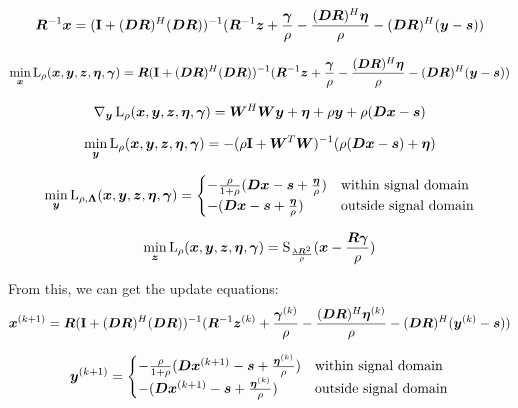 \documentclass{article}
\begin{document}
\begin{equation}
\bm{R}^{-1}\bm{x} = ({\bf I} + (\bm{D}\bm{R})^H(\bm{D}\bm{R}))^{-1}(\bm{R}^{-1}\bm{z} + \frac{\bm{\gamma}}{\rho} - \frac{(\bm{D}\bm{R})^H\bm{\eta}}{\rho} - (\bm{D}\bm{R})^H(\bm{y} - \bm{s}))
\end{equation}

\begin{equation}
\min_{\bm{x}} \operatorname{L}_{\rho}(\bm{x},\bm{y},\bm{z},\bm{\eta},\bm{\gamma}) = \bm{R}({\bf I} + (\bm{D}\bm{R})^H(\bm{D}\bm{R}))^{-1}(\bm{R}^{-1}\bm{z} + \frac{\bm{\gamma}}{\rho} - \frac{(\bm{D}\bm{R})^H\bm{\eta}}{\rho} - (\bm{D}\bm{R})^H(\bm{y} - \bm{s}))
\end{equation}






\begin{equation}
\nabla_{\bm{y}}\operatorname{L}_{\rho}(\bm{x},\bm{y},\bm{z},\bm{\eta},\bm{\gamma}) = \bm{W}^H\bm{W}\bm{y} + \bm{\eta} + \rho\bm{y} + \rho (\bm{D}\bm{x} - \bm{s})
\end{equation}

\begin{equation}
\min_{\bm{y}} \operatorname{L}_{\rho}(\bm{x},\bm{y},\bm{z},\bm{\eta},\bm{\gamma}) = -(\rho{\bf I} + \bm{W}^T\bm{W})^{-1}(\rho(\bm{D}\bm{x} - \bm{s}) + \bm{\eta})
\end{equation}

\begin{equation}
\min_{\bm{y}} \operatorname{L}_{\rho,\bm{\Lambda}}(\bm{x},\bm{y},\bm{z},\bm{\eta},\bm{\gamma}) = \begin{cases}
-\frac{\rho}{1 + \rho}(\bm{D}\bm{x} - \bm{s}  + \frac{\bm{\eta}}{\rho}) & \text{within signal domain}\\
-(\bm{D}\bm{x} - \bm{s}  + \frac{\bm{\eta}}{\rho}) & \text{outside signal domain}
\end{cases}
\end{equation}

\begin{equation}
\min_{\bm{z}} \operatorname{L}_{\rho}(\bm{x},\bm{y},\bm{z},\bm{\eta},\bm{\gamma}) = \operatorname{S}_{\frac{\lambda\bm{R}^2}{\rho}}(\bm{x} - \frac{\bm{R}\bm{\gamma}}{\rho})
\end{equation}

From this, we can get the update equations:
\begin{equation}
\bm{x}^{(k + 1)} = \bm{R}({\bf I} + (\bm{D}\bm{R})^H(\bm{D}\bm{R}))^{-1}(\bm{R}^{-1}\bm{z}^{(k)} + \frac{\bm{\gamma}^{(k)}}{\rho} - \frac{(\bm{D}\bm{R})^H\bm{\eta}^{(k)}}{\rho} - (\bm{D}\bm{R})^H(\bm{y}^{(k)} - \bm{s}))
\end{equation}

\begin{equation}
\bm{y}^{(k + 1)}= \begin{cases}
-\frac{\rho}{1 + \rho}(\bm{D}\bm{x}^{(k + 1)} - \bm{s}  + \frac{\bm{\eta}^{(k)}}{\rho}) & \text{within signal domain}\\
-(\bm{D}\bm{x}^{(k + 1)} - \bm{s}  + \frac{\bm{\eta}^{(k)}}{\rho}) & \text{outside signal domain}
\end{cases}
\end{equation}
\end{document}
